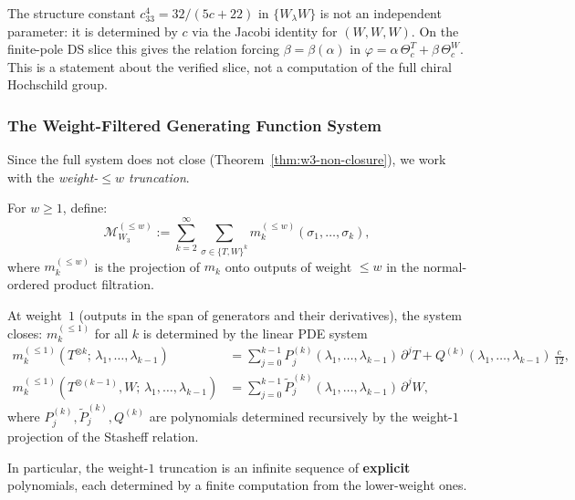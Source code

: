 \begin{remark}
\label{rem:zamolodchikov-constraint}
The structure constant $c_{33}^4 = 32/(5c+22)$ in $\{W_\lambda W\}$ is
not an independent parameter: it is determined by $c$ via the Jacobi
identity for $(W,W,W)$. On the finite-pole DS slice this gives the
relation forcing $\beta=\beta(\alpha)$ in
$\varphi=\alpha\,\Theta_c^T+\beta\,\Theta_c^W$. This is a statement
about the verified slice, not a computation of the full chiral
Hochschild group.
\end{remark}

\subsubsection{The Weight-Filtered Generating Function System}

Since the full system does not close (Theorem~\ref{thm:w3-non-closure}),
we work with the \emph{weight-$\le w$ truncation}.

\begin{definition}
\label{def:w3-weight-truncated}
For $w \ge 1$, define:
\begin{equation}
\mathcal{M}_{W_3}^{(\le w)}
:= \sum_{k=2}^\infty \sum_{\sigma \in \{T,W\}^k}
 m_k^{(\le w)}(\sigma_1, \ldots, \sigma_k),
\end{equation}
where $m_k^{(\le w)}$ is the projection of $m_k$ onto outputs of
weight $\le w$ in the normal-ordered product filtration.
\end{definition}

\begin{proposition}
\label{prop:w3-weight-1-closure}
At weight~$1$ (outputs in the span of generators and their derivatives),
the system closes: $m_k^{(\le 1)}$ for all $k$ is determined by the
linear PDE system
\begin{equation}
\label{eq:w3-weight-1-system}
\begin{aligned}
m_k^{(\le 1)}(T^{\otimes k};\, \lambda_1, \ldots, \lambda_{k-1})
&= \sum_{j=0}^{k-1} P_j^{(k)}(\lambda_1, \ldots, \lambda_{k-1})\, \partial^j T
 + Q^{(k)}(\lambda_1, \ldots, \lambda_{k-1})\, \tfrac{c}{12},\\
m_k^{(\le 1)}(T^{\otimes(k-1)}, W;\, \lambda_1, \ldots, \lambda_{k-1})
&= \sum_{j=0}^{k-1} \tilde{P}_j^{(k)}(\lambda_1, \ldots, \lambda_{k-1})\, \partial^j W,
\end{aligned}
\end{equation}
where $P_j^{(k)}, \tilde{P}_j^{(k)}, Q^{(k)}$ are polynomials
determined recursively by the weight-$1$ projection of the Stasheff
relation.

In particular, the weight-$1$ truncation is an infinite sequence
of \textbf{explicit} polynomials, each determined by a finite
computation from the lower-weight ones.
\end{proposition}

